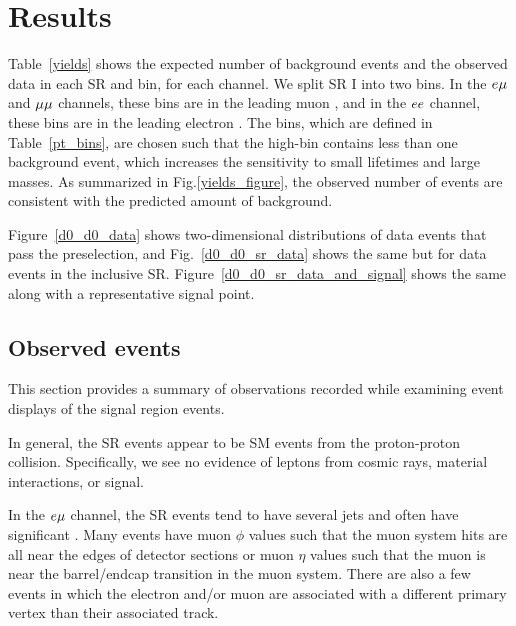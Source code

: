 \section{Results}
\label{results}

Table~\ref{yields} shows the expected number of background events and the observed data in each SR and \pt bin, for each channel. We split SR I into two bins. In the $e{\mu}$ and ${\mu}{\mu}$ channels, these bins are in the leading muon \pt, and in the $ee$ channel, these bins are in the leading electron \pt. The \pt bins, which are defined in Table~\ref{pt_bins}, are chosen such that the high-\pt bin contains less than one background event, which increases the sensitivity to small lifetimes and large masses. As summarized in Fig.\ref{yields_figure}, the observed number of events are consistent with the predicted amount of background.





Figure~\ref{d0_d0_data} shows two-dimensional \ad distributions of data events that pass the preselection, and Fig.~\ref{d0_d0_sr_data} shows the same but for data events in the inclusive SR. Figure~\ref{d0_d0_sr_data_and_signal} shows the same along with a representative signal point.



\subsection{Observed events}
This section provides a summary of observations recorded while examining event displays of the signal region events.

In general, the SR events appear to be SM events from the proton-proton collision. Specifically, we see no evidence of leptons from cosmic rays, material interactions, or signal.

In the $e{\mu}$ channel, the SR events tend to have several jets and often have significant \ptmiss. Many events have muon $\phi$ values such that the muon system hits are all near the edges of detector sections or muon $\eta$ values such that the muon is near the barrel/endcap transition in the muon system. There are also a few events in which the electron and/or muon are associated with a different primary vertex than their associated track.

